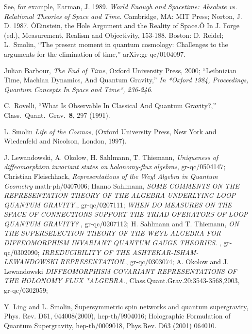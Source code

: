 \documentclass[12pt]{article}
\begin{document}
\begin{thebibliography}{0}
{See, for example, Earman, J. 1989. {\it World Enough and Spacetime:
Absolute vs. Relational Theories
of Space and Time.} Cambridge, MA: MIT Press;
Norton, J. D. 1987. ÒEinstein, the Hole Argument and the Reality of Space.Ó In
J. Forge (ed.), Measurement, Realism and Objectivity, 153-188. Boston: D. Reidel;
L.~Smolin,
``The present moment in quantum cosmology: Challenges to the arguments  for the elimination of time,''
arXiv:gr-qc/0104097.


Julian Barbour, {\it The End of Time},
Oxford University Press, 2000;
``Leibnizian Time, Machian Dynamics, And Quantum Gravity,''
{\it  In *Oxford 1984, Proceedings, Quantum Concepts In Space and Time*, 236-246}.

C.~Rovelli,
``What Is Observable In Classical And Quantum Gravity?,''
Class.\ Quant.\ Grav.\  {\bf 8}, 297 (1991).

L. Smolin {\it Life of the Cosmos},
(Oxford University Press, New York and Wiedenfeld and Nicolson,
London, 1997).

J. Lewandowski, A. Okolow, H.  Sahlmann, T.  Thiemann,
{\it Uniqueness of diffeomorphism invariant states on holonomy-flux algebras},
gr-qc/0504147;  Christian Fleischhack, {\it Representations of the Weyl Algebra in Quantum Geometry}  math-ph/0407006; 
Hanno Sahlmann, {\it SOME COMMENTS ON THE REPRESENTATION THEORY OF THE ALGEBRA UNDERLYING LOOP QUANTUM GRAVITY.},  gr-qc/0207111; 
{\it  WHEN DO MEASURES ON THE SPACE OF CONNECTIONS SUPPORT THE TRIAD OPERATORS
OF LOOP QUANTUM GRAVITY? } ,  gr-qc/0207112; 
 H.  Sahlmann  and T. Thiemann, {\it 
 ON THE SUPERSELECTION THEORY OF THE WEYL ALGEBRA FOR DIFFEOMORPHISM
INVARIANT QUANTUM GAUGE THEORIES.} ,  gr-qc/0302090; 
{\it  IRREDUCIBILITY OF THE ASHTEKAR-ISHAM-LEWANDOWSKI REPRESENTATION.},
gr-qc/0303074; A. Okolow and  J.  Lewandowski
{\it  DIFFEOMORPHISM COVARIANT REPRESENTATIONS OF THE HOLONOMY FLUX *ALGEBRA.}, Class.Quant.Grav.20:3543-3568,2003, gr-qc/0302059; 


Y. Ling and L. Smolin,
Supersymmetric spin networks and quantum supergravity,
Phys. Rev. D61, 044008(2000), hep-th/9904016;
Holographic Formulation of Quantum Supergravity, hep-th/0009018,
Phys.Rev. D63 (2001) 064010.

}
\end{thebibliography}
\end{document}
